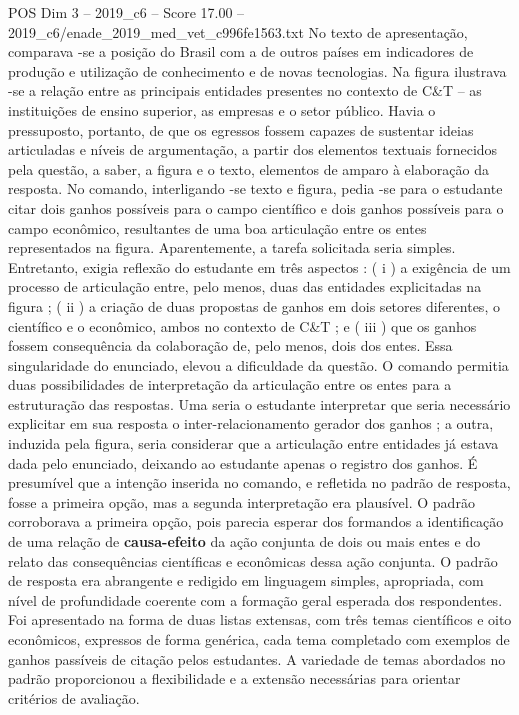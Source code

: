 \begin{textsample}{POS Dim 3 – 2019\_c6 – Score 17.00 – 2019\_c6/enade\_2019\_med\_vet\_c996fe1563.txt}
No texto de apresentação, comparava -se a posição do Brasil com a de outros países em indicadores de produção e utilização de conhecimento e de novas tecnologias.
Na figura ilustrava -se a relação entre as principais entidades presentes no contexto de C\&T – as instituições de ensino superior, as empresas e o setor público.
Havia o pressuposto, portanto, de que os egressos fossem capazes de sustentar ideias articuladas e níveis de argumentação, a partir dos elementos textuais fornecidos pela questão, a saber, a figura e o texto, elementos de amparo à elaboração da resposta.
No comando, interligando -se texto e figura, pedia -se para o estudante citar dois ganhos possíveis para o campo científico e dois ganhos possíveis para o campo econômico, resultantes de uma boa articulação entre os entes representados na figura.
Aparentemente, a tarefa solicitada seria simples.
Entretanto, exigia reflexão do estudante em três aspectos : ( i ) a exigência de um processo de articulação entre, pelo menos, duas das entidades explicitadas na figura ; ( ii ) a criação de duas propostas de ganhos em dois setores diferentes, o científico e o econômico, ambos no contexto de C\&T ; e ( iii ) que os ganhos fossem consequência da colaboração de, pelo menos, dois dos entes.
Essa singularidade do enunciado, elevou a dificuldade da questão.
O comando permitia duas possibilidades de interpretação da articulação entre os entes para a estruturação das respostas.
Uma seria o estudante interpretar que seria necessário explicitar em sua resposta o inter-relacionamento gerador dos ganhos ; a outra, induzida pela figura, seria considerar que a articulação entre entidades já estava dada pelo enunciado, deixando ao estudante apenas o registro dos ganhos.
É presumível que a intenção inserida no comando, e refletida no padrão de resposta, fosse a primeira opção, mas a segunda interpretação era plausível.
O padrão corroborava a primeira opção, pois parecia esperar dos formandos a identificação de uma relação de \textbf{causa-efeito} da ação conjunta de dois ou mais entes e do relato das consequências científicas e econômicas dessa ação conjunta.
O padrão de resposta era abrangente e redigido em linguagem simples, apropriada, com nível de profundidade coerente com a formação geral esperada dos respondentes.
Foi apresentado na forma de duas listas extensas, com três temas científicos e oito econômicos, expressos de forma genérica, cada tema completado com exemplos de ganhos passíveis de citação pelos estudantes.
A variedade de temas abordados no padrão proporcionou a flexibilidade e a extensão necessárias para orientar critérios de avaliação.

\end{textsample}
